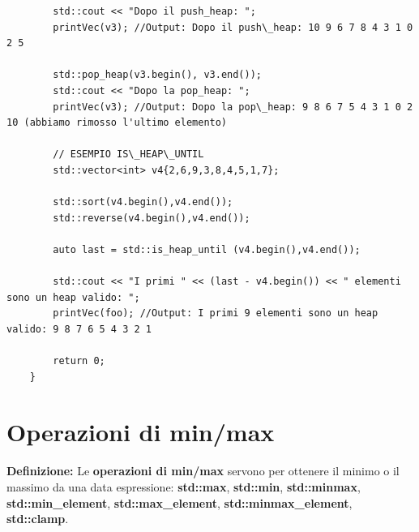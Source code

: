 \begin{lstlisting}
		std::cout << "Dopo il push_heap: ";
		printVec(v3); //Output: Dopo il push\_heap: 10 9 6 7 8 4 3 1 0 2 5
		
		std::pop_heap(v3.begin(), v3.end());
		std::cout << "Dopo la pop_heap: ";
		printVec(v3); //Output: Dopo la pop\_heap: 9 8 6 7 5 4 3 1 0 2 10 (abbiamo rimosso l'ultimo elemento)
		
		// ESEMPIO IS\_HEAP\_UNTIL
		std::vector<int> v4{2,6,9,3,8,4,5,1,7};
		
		std::sort(v4.begin(),v4.end());
		std::reverse(v4.begin(),v4.end());
		
		auto last = std::is_heap_until (v4.begin(),v4.end());
		
		std::cout << "I primi " << (last - v4.begin()) << " elementi sono un heap valido: ";
		printVec(foo); //Output: I primi 9 elementi sono un heap valido: 9 8 7 6 5 4 3 2 1
		
		return 0;
	}
\end{lstlisting}


\newpage

\section{Operazioni di min/max}

\textsf{\small \textbf{Definizione: } Le \textbf{operazioni di min/max} servono per ottenere il minimo o il massimo da una data espressione: \textbf{std::max}, \textbf{std::min}, \textbf{std::minmax}, \textbf{std::min\_element}, \textbf{std::max\_element}, \textbf{std::minmax\_element}, \textbf{std::clamp}.} \\


